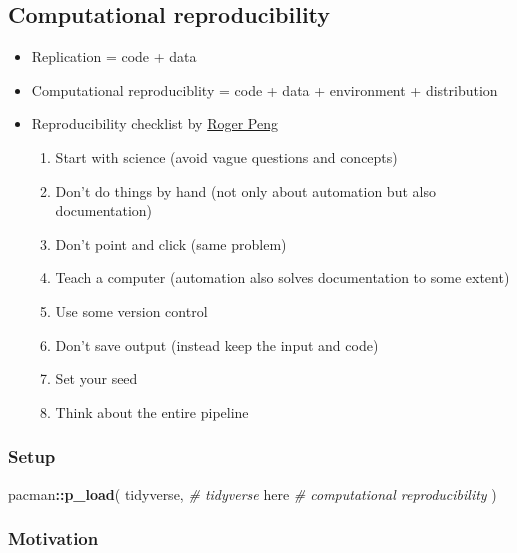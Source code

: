 \documentclass[
]{book}
\newenvironment{Shaded}{\begin{snugshade}}{\end{snugshade}}
\newcommand{\CommentTok}[1]{\textcolor[rgb]{0.56,0.35,0.01}{\textit{#1}}}
\newcommand{\KeywordTok}[1]{\textcolor[rgb]{0.13,0.29,0.53}{\textbf{#1}}}
\newcommand{\NormalTok}[1]{#1}
\newcommand{\OperatorTok}[1]{\textcolor[rgb]{0.81,0.36,0.00}{\textbf{#1}}}
\begin{document}
\hypertarget{computational-reproducibility}{%
\subsection{Computational reproducibility}\label{computational-reproducibility}}

\begin{itemize}
\item
  Replication = code + data
\item
  Computational reproduciblity = code + data + environment + distribution
\item
  Reproducibility checklist by \href{http://www.biostat.jhsph.edu/~rpeng/}{Roger Peng}

  \begin{enumerate}
  \def\labelenumi{\arabic{enumi}.}
  \item
    Start with science (avoid vague questions and concepts)
  \item
    Don't do things by hand (not only about automation but also documentation)
  \item
    Don't point and click (same problem)
  \item
    Teach a computer (automation also solves documentation to some extent)
  \item
    Use some version control
  \item
    Don't save output (instead keep the input and code)
  \item
    Set your seed
  \item
    Think about the entire pipeline
  \end{enumerate}
\end{itemize}

\hypertarget{setup}{%
\subsubsection{Setup}\label{setup}}

\begin{Shaded}
\begin{Highlighting}[]
\NormalTok{pacman}\OperatorTok{::}\KeywordTok{p\_load}\NormalTok{(}
\NormalTok{  tidyverse, }\CommentTok{\# tidyverse}
\NormalTok{  here }\CommentTok{\# computational reproducibility}
\NormalTok{)}
\end{Highlighting}
\end{Shaded}

\hypertarget{motivation-1}{%
\subsubsection{Motivation}\label{motivation-1}}
\end{document}

